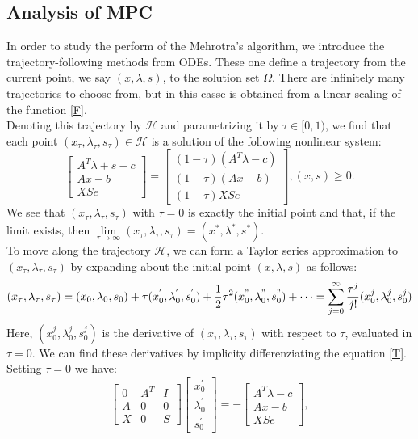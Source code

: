 \documentclass[a4paper,10 pt,titlepage,twoside]{book}
\theoremstyle{plain}
\theoremstyle{definition}
\theoremstyle{remark}
\begin{document}
\subsection*{Analysis of MPC}
In order to study the perform of the Mehrotra's algorithm, we introduce the trajectory-following methods from ODEs. These one define a trajectory from the current point, we say $(x,\lambda,s)$, to the solution set $\Omega$. There are infinitely many trajectories to choose from, but in this casse is obtained from a linear scaling of the function \ref{F}.\\ Denoting this trajectory by $\mathcal{H}$ and parametrizing it by $\tau\in[0,1)$, we find that each point $(x_{\tau},\lambda_{\tau},s_{\tau})\in\mathcal{H}$ is a solution of the following nonlinear system:
\begin{equation}\label{T}
	\begin{bmatrix}
	A^{T}\lambda+s-c \\Ax-b \\XSe
	\end{bmatrix}=\begin{bmatrix}
	(1-\tau)(A^{T}\lambda-c)\\(1-\tau)(Ax-b)\\(1-\tau)XSe
	\end{bmatrix}, (x,s)\geq0.
\end{equation}
We see that $(x_{\tau},\lambda_{\tau},s_{\tau})$ with $\tau = 0$ is exactly the initial point and that, if the limit exists, then $\lim\limits_{\tau\to\infty}(x_{\tau},\lambda_{\tau},s_{\tau}) = (x^{*},\lambda^{*},s^{*})$.\\
To move along the trajectory $\mathcal{H}$, we can form a Taylor series approximation to $(x_{\tau},\lambda_{\tau},s_{\tau})$ by expanding about the initial point  $(x,\lambda,s)$ as follows:
\begin{equation*}
(x_{\tau},\lambda_{\tau},s_{\tau})=(x_{0},\lambda_{0},s_{0})+\tau(x_{0}^{'},\lambda_{0}^{'},s_{0}^{'})+\frac{1}{2}\tau^{2}(x_{0}^{"},\lambda_{0}^{"},s_{0}^{"})+\dots = \sum_{j=0}^{\infty}\frac{\tau^{j}}{j!}(x_{0}^{j},\lambda_{0}^{j},s_{0}^{j})
\end{equation*}
Here, $(x_{0}^{j},\lambda_{0}^{j},s_{0}^{j})$ is the derivative of $(x_{\tau},\lambda_{\tau},s_{\tau})$ with respect to $\tau$, evaluated in $\tau = 0$. We can find these derivatives by implicity differenziating the equation \ref{T}. Setting $\tau=0$ we have:
\begin{equation}
\begin{bmatrix}
0&A^{T}&I \\A&0&0\\X&0&S
\end{bmatrix}\begin{bmatrix}
x_{0}^{'}\\\lambda_{0}^{'}\\s_{0}^{'}
\end{bmatrix}=-\begin{bmatrix}
A^{T}\lambda-c\\Ax-b\\XSe
\end{bmatrix},
\end{equation}
\end{document}
